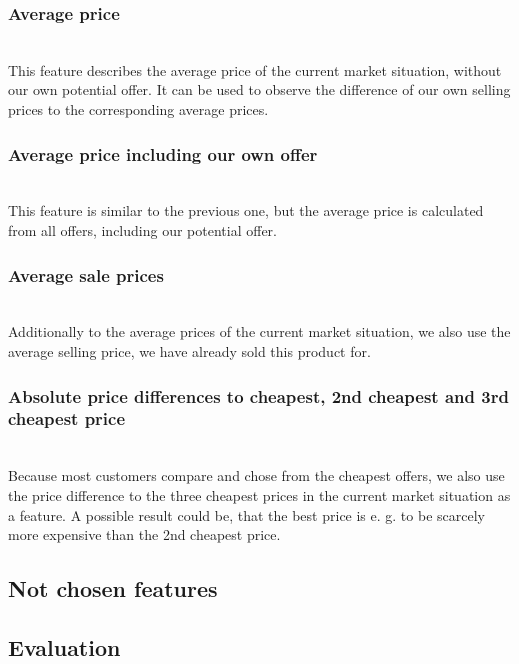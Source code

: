 \subsubsection{Average price}
	~\\
	This feature describes the average price of the current market situation, without our own potential offer. It can be used to observe the difference of our own selling prices to the corresponding average prices.
\subsubsection{Average price including our own offer}
	~\\
	This feature is similar to the previous one, but the average price is calculated from all offers, including our potential offer.
\subsubsection{Average sale prices}
	~\\
	Additionally to the average prices of the current market situation, we also use the average selling price, we have already sold this product for.
\subsubsection{Absolute price differences to cheapest, 2nd cheapest and 3rd cheapest price}
	~\\
	Because most customers compare and chose from the cheapest offers, we also use the price difference to the three cheapest prices in the current market situation as a feature. A possible result could be, that the best price is e. g. to be scarcely more expensive than the 2nd cheapest price.
\subsection{Not chosen features}
\subsection{Evaluation}
